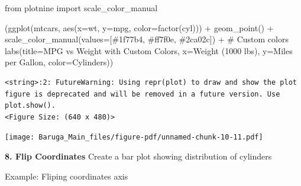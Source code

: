\documentclass[
  letterpaper,
  DIV=11,
  numbers=noendperiod]{scrreprt}
\newenvironment{Shaded}{\begin{snugshade}}{\end{snugshade}}
\newcommand{\CommentTok}[1]{\textcolor[rgb]{0.37,0.37,0.37}{#1}}
\newcommand{\ImportTok}[1]{\textcolor[rgb]{0.00,0.46,0.62}{#1}}
\newcommand{\NormalTok}[1]{\textcolor[rgb]{0.00,0.23,0.31}{#1}}
\newcommand{\OperatorTok}[1]{\textcolor[rgb]{0.37,0.37,0.37}{#1}}
\newcommand{\StringTok}[1]{\textcolor[rgb]{0.13,0.47,0.30}{#1}}
\begin{document}
\begin{Shaded}
\begin{Highlighting}[]
\ImportTok{from}\NormalTok{ plotnine }\ImportTok{import}\NormalTok{ scale\_color\_manual}

\NormalTok{(ggplot(mtcars, aes(x}\OperatorTok{=}\StringTok{\textquotesingle{}wt\textquotesingle{}}\NormalTok{, y}\OperatorTok{=}\StringTok{\textquotesingle{}mpg\textquotesingle{}}\NormalTok{, color}\OperatorTok{=}\StringTok{\textquotesingle{}factor(cyl)\textquotesingle{}}\NormalTok{)) }\OperatorTok{+}
\NormalTok{ geom\_point() }\OperatorTok{+}
\NormalTok{ scale\_color\_manual(values}\OperatorTok{=}\NormalTok{[}\StringTok{\textquotesingle{}\#1f77b4\textquotesingle{}}\NormalTok{, }\StringTok{\textquotesingle{}\#ff7f0e\textquotesingle{}}\NormalTok{, }\StringTok{\textquotesingle{}\#2ca02c\textquotesingle{}}\NormalTok{]) }\OperatorTok{+}  \CommentTok{\# Custom colors}
\NormalTok{ labs(title}\OperatorTok{=}\StringTok{\textquotesingle{}MPG vs Weight with Custom Colors\textquotesingle{}}\NormalTok{,}
\NormalTok{      x}\OperatorTok{=}\StringTok{\textquotesingle{}Weight (1000 lbs)\textquotesingle{}}\NormalTok{,}
\NormalTok{      y}\OperatorTok{=}\StringTok{\textquotesingle{}Miles per Gallon\textquotesingle{}}\NormalTok{,}
\NormalTok{      color}\OperatorTok{=}\StringTok{\textquotesingle{}Cylinders\textquotesingle{}}\NormalTok{))}
\end{Highlighting}
\end{Shaded}

\begin{verbatim}
<string>:2: FutureWarning: Using repr(plot) to draw and show the plot figure is deprecated and will be removed in a future version. Use plot.show().
<Figure Size: (640 x 480)>
\end{verbatim}

\texttt{[image: Baruga\_Main\_files/figure-pdf/unnamed-chunk-10-11.pdf]}

\textbf{8. Flip Coordinates} Create a bar plot showing distribution of
cylinders

Example: Fliping coordinates axis
\end{document}
